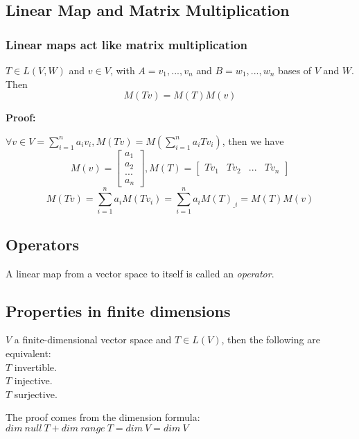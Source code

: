 \documentclass{article}
\begin{document}
\subsection{Linear Map and Matrix Multiplication}
\subsubsection{Linear maps act like matrix multiplication}
\begin{addmargin}[1em]{0em}
$T\in L(V,W)$ and $v\in V$, with $A = v_1, ..., v_n$ and $B = w_1, ..., w_n$ bases of $V$ and $W$. Then
\begin{equation*}
    M(Tv) = M(T)M(v)
\end{equation*}
\end{addmargin}
\textbf{Proof:}
\begin{addmargin}[1em]{0em}
$\forall v \in V = \sum_{i=1}^{n}a_iv_i, M(Tv) = M(\sum_{i=1}^{n}a_iTv_i)$, then we have
\begin{equation*}
M(v) = \begin{bmatrix}
a_1\\
a_2\\
...\\
a_n
\end{bmatrix}, M(T) = \begin{bmatrix}
Tv_1 & Tv_2 & ... & Tv_n
\end{bmatrix}
\end{equation*}
\begin{equation*}
    M(Tv) = \sum_{i=1}^{n} a_iM(Tv_i) = \sum_{i=1}^{n} a_iM(T)_{\_i} = M(T)M(v)
\end{equation*}
\end{addmargin}
\subsection{Operators}
\begin{addmargin}[1em]{0em}
A linear map from a vector space to itself is called an \textit{operator}.
\end{addmargin}
\subsection{Properties in finite dimensions}
\begin{addmargin}[1em]{0em}
$V$ a finite-dimensional vector space and $T\in L(V)$, then the following are equivalent:\\
$T$ invertible.\\
$T$ injective.\\
$T$ surjective.
\end{addmargin}
The proof comes from the dimension formula:\\
$dim\ null\ T + dim\ range\ T = dim\ V = dim\ V$
\end{document}
